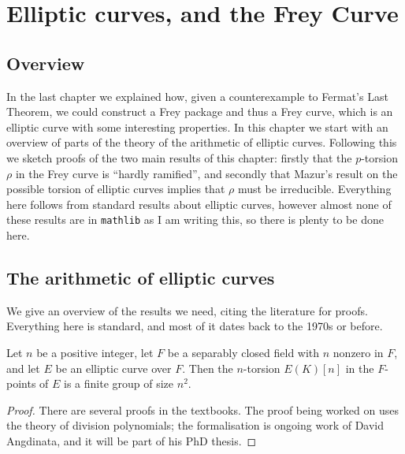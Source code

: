 \chapter{Elliptic curves, and the Frey Curve}

\section{Overview}

In the last chapter we explained how, given a counterexample to Fermat's Last Theorem, we could construct a Frey package and thus a Frey curve, which is an elliptic curve with some interesting properties. In this chapter we start with an overview of parts of the theory of the arithmetic of elliptic curves. Following
this we sketch proofs of the two main results of this chapter: firstly that the $p$-torsion $\rho$ in the Frey curve is ``hardly ramified'', and secondly that Mazur's result on the possible torsion of elliptic curves implies that $\rho$ must be irreducible. Everything here follows from standard results about elliptic curves, however almost none of these results are in {\tt mathlib} as I am writing this, so there is plenty to be done here.

\section{The arithmetic of elliptic curves}

We give an overview of the results we need, citing the literature for proofs. Everything here is
 standard, and most of it dates back to the 1970s or before.

\begin{theorem}\label{EllipticCurve.n_torsion_card}\notready
  Let $n$ be a positive integer, let $F$ be a separably closed
  field with $n$ nonzero in $F$, and let $E$ be an elliptic curve over $F$. Then the $n$-torsion $E(K)[n]$ 
  in the $F$-points of $E$ is a finite group of size $n^2$.
\end{theorem}
\begin{proof}
  There are several proofs in the textbooks. The proof being worked on uses the theory of division polynomials; the formalisation is ongoing work of David Angdinata, and it will be part of his PhD thesis.
\end{proof}

